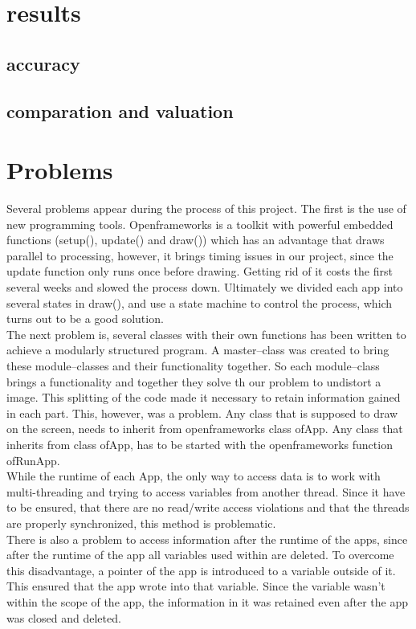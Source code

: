 \documentclass[journal,final,a4paper,twoside]{PS}
\begin{document}
\section{results}
\label{sec:results}
\subsection{accuracy}
\subsection{comparation and valuation}

\section{Problems}
\label{sec:probs}
Several problems appear during the process of this project.
The first is the use of new programming tools. Openframeworks is a toolkit with powerful embedded functions (setup(), update() and draw()) which has an advantage that draws parallel to processing, however, it brings timing issues in our project, since the update function only runs once before drawing. Getting rid of it costs the first several weeks and slowed the process down. Ultimately we divided each app into several states in draw(), and use a state machine to control the process, which turns out to be a good solution.  \\
The next problem is, several classes with their own functions has been written to achieve a modularly structured program. A  master--class was created to bring these module--classes and their functionality together. So each module--class brings a functionality and together they solve th our problem to undistort a image. This splitting of the code made it necessary to retain information gained in each part. This, however, was a problem. Any class that is supposed to draw on the screen, needs to inherit from openframeworks class ofApp. Any class that inherits from class ofApp, has to be started with the openframeworks function ofRunApp.\\
While the runtime of each App, the only way to access data is to work with multi-threading and trying to access variables from another thread. Since it have to be ensured, that there are no read/write access violations and that the threads are properly synchronized, this method is problematic. \\
There is also a problem to access information after the runtime of the apps, since after the runtime of the app all variables used within are deleted. To overcome this disadvantage, a pointer of the app is introduced to a variable outside of it. This ensured that the app wrote into that variable. Since the variable wasn't within the scope of the app, the information in it was retained even after the app was closed and deleted.\\
\end{document}
